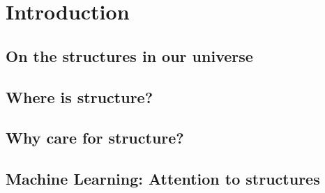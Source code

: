 



\chapter*{Introduction}
\label{chap:Intro}
\renewcommand{\chapterheadstart}{~\vspace{1.7cm}\\}
\section{On the structures in our universe}
\section{Where is structure?}
\section{Why care for structure?}
\section{Machine Learning: Attention to structures}

